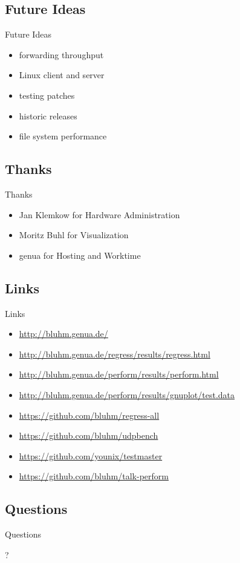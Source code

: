 \documentclass[14pt,aspectratio=169]{beamer}
\begin{document}
\subsection{Future Ideas}
\begin{frame}{Future Ideas}
\begin{itemize}
    \item forwarding throughput
    \item Linux client and server
    \item testing patches
    \item historic releases
    \item file system performance
\end{itemize}
\end{frame}

\subsection{Thanks}
\begin{frame}{Thanks}
\begin{itemize}
    \item Jan Klemkow for Hardware Administration
    \item Moritz Buhl for Visualization
    \item genua for Hosting and Worktime
\end{itemize}
\end{frame}

\subsection{Links}
\begin{frame}{Links}
\begin{itemize}
    \small
    \item \url{http://bluhm.genua.de/}
    \item \url{http://bluhm.genua.de/regress/results/regress.html}
    \item \url{http://bluhm.genua.de/perform/results/perform.html}
    \item \url{http://bluhm.genua.de/perform/results/gnuplot/test.data}
    \item \url{https://github.com/bluhm/regress-all}
    \item \url{https://github.com/bluhm/udpbench}
    \item \url{https://github.com/younix/testmaster}
    \item \url{https://github.com/bluhm/talk-perform}
\end{itemize}
\end{frame}

\subsection{Questions}
\begin{frame}{Questions}
\begin{center}
?
\end{center}
\end{frame}
\end{document}
